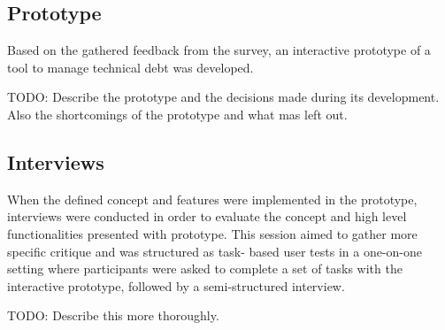 \subsection{Prototype}
Based on the gathered feedback from the survey, an interactive prototype of a tool to manage technical debt was developed.

TODO: Describe the prototype and the decisions made during its development. Also the shortcomings of the prototype and what mas left out.

\subsection{Interviews}
When the defined concept and features were implemented in the prototype, interviews were conducted in order to evaluate the concept and high level functionalities presented with prototype. 
This session aimed to gather more specific critique and was structured as task- based user tests in a one-on-one setting where participants were asked to complete a set of tasks with the interactive prototype, followed by a semi-structured interview.

TODO: Describe this more thoroughly.